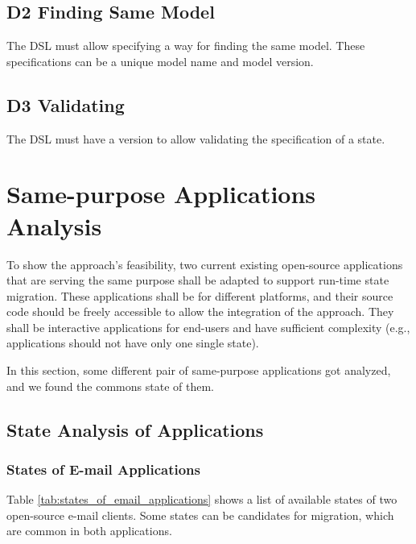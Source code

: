 \subsection{D2 Finding Same Model}
The DSL must allow specifying a way for finding the same model. These specifications can be a unique model name and model version.
\subsection{D3 Validating}    
The DSL must have a version to allow validating the specification of a state.



\section{Same-purpose Applications Analysis}
To show the approach's feasibility, two current existing open-source applications that are serving the same purpose shall be adapted to support run-time state migration.
These applications shall be for different platforms, and their source code should be freely accessible to allow the integration of the approach.
They shall be interactive applications for end-users and have sufficient complexity (e.g., applications should not have only one single state).

In this section, some different pair of same-purpose applications got analyzed, and we found the commons state of them.

\subsection{State Analysis of Applications}
\subsubsection{States of E-mail Applications}

Table \ref{tab:states_of_email_applications} shows a list of available states of two open-source e-mail clients. Some states can be candidates for migration, which are common in both applications.

